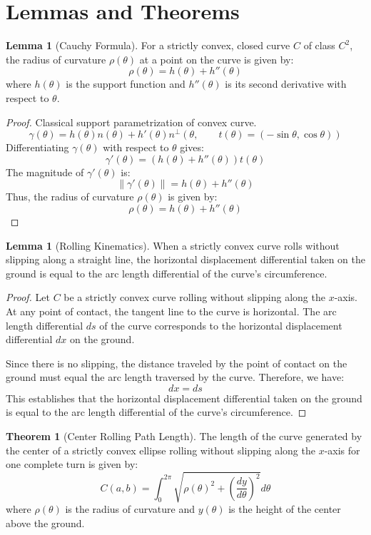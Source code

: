 \documentclass[12pt]{article}
\theoremstyle{definition}
\newtheorem{lemma}[definition]{Lemma}
\newtheorem{theorem}[definition]{Theorem}
\begin{document}
\section{Lemmas and Theorems}
\begin{lemma}[Cauchy Formula]
    For a strictly convex, closed curve $C$ of class $C^2$, the radius of curvature $\rho(\theta)$ at a point on the curve is given by:
    \[
        \rho(\theta) = h(\theta) + h''(\theta)
    \]
    where $h(\theta)$ is the support function and $h''(\theta)$ is its second derivative with respect to $\theta$.
\end{lemma}

\begin{proof}
    Classical support parametrization of convex curve.
    \[
        \gamma(\theta) = h(\theta)n(\theta) + h'(\theta)n^{\perp}(\theta, \qquad t(\theta)=(-\sin\theta, \cos\theta))
    \]
    Differentiating $\gamma(\theta)$ with respect to $\theta$ gives:
    \[
        \gamma'(\theta) = (h(\theta) + h''(\theta)) t(\theta)
    \]
    The magnitude of $\gamma'(\theta)$ is:
    \[
        \|\gamma'(\theta)\| = h(\theta) + h''(\theta)
    \]
    Thus, the radius of curvature $\rho(\theta)$ is given by:
    \[
        \rho(\theta) = h(\theta) + h''(\theta)
    \]
\end{proof}

\begin{lemma}[Rolling Kinematics]
    When a strictly convex curve rolls without slipping along a straight line, the horizontal displacement differential taken on the ground is equal to the arc length differential of the curve's circumference.
\end{lemma}

\begin{proof}
    Let $C$ be a strictly convex curve rolling without slipping along the $x$-axis. At any point of contact, the tangent line to the curve is horizontal. The arc length differential $ds$ of the curve corresponds to the horizontal displacement differential $dx$ on the ground.

    Since there is no slipping, the distance traveled by the point of contact on the ground must equal the arc length traversed by the curve. Therefore, we have:
    \[
        dx = ds
    \]
    This establishes that the horizontal displacement differential taken on the ground is equal to the arc length differential of the curve's circumference.
\end{proof}

\begin{theorem}[Center Rolling Path Length]
    The length of the curve generated by the center of a strictly convex ellipse rolling without slipping along the $x$-axis for one complete turn is given by:
    \[
        C(a,b)=\int_{0}^{2\pi}\sqrt{\rho(\theta)^2+\left(\frac{dy}{d\theta}\right)^2}d\theta
    \]
    where $\rho(\theta)$ is the radius of curvature and $y(\theta)$ is the height of the center above the ground.
\end{theorem}
\end{document}
